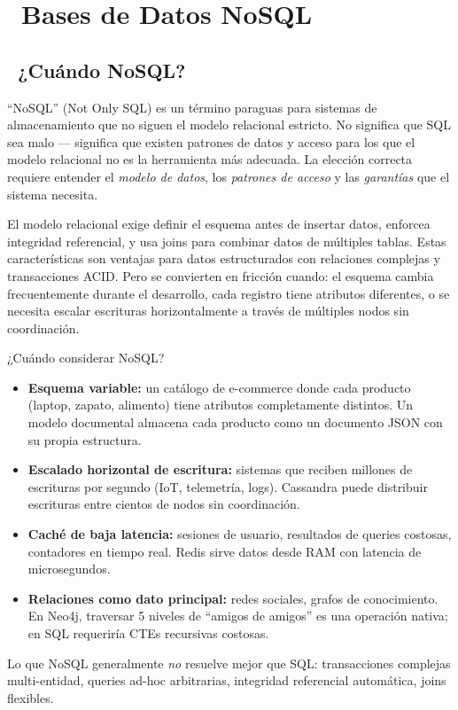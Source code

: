 \chapter[Bases de Datos NoSQL]{~Bases de Datos NoSQL}

\section[¿Cuándo NoSQL?]{~¿Cuándo NoSQL?}

``NoSQL'' (Not Only SQL) es un término paraguas para sistemas de almacenamiento que no siguen el modelo relacional estricto.
No significa que SQL sea malo — significa que existen patrones de datos y acceso para los que el modelo relacional no es la herramienta más adecuada.
La elección correcta requiere entender el \emph{modelo de datos}, los \emph{patrones de acceso} y las \emph{garantías} que el sistema necesita.

El modelo relacional exige definir el esquema antes de insertar datos, enforcea integridad referencial, y usa joins para combinar datos de múltiples tablas.
Estas características son ventajas para datos estructurados con relaciones complejas y transacciones ACID.
Pero se convierten en fricción cuando: el esquema cambia frecuentemente durante el desarrollo, cada registro tiene atributos diferentes, o se necesita escalar escrituras horizontalmente a través de múltiples nodos sin coordinación.

\begin{teoriabox}{¿Cuándo considerar NoSQL?}
\begin{itemize}
  \item \textbf{Esquema variable:} un catálogo de e-commerce donde cada producto (laptop, zapato, alimento) tiene atributos completamente distintos. Un modelo documental almacena cada producto como un documento JSON con su propia estructura.
  \item \textbf{Escalado horizontal de escritura:} sistemas que reciben millones de escrituras por segundo (IoT, telemetría, logs). Cassandra puede distribuir escrituras entre cientos de nodos sin coordinación.
  \item \textbf{Caché de baja latencia:} sesiones de usuario, resultados de queries costosas, contadores en tiempo real. Redis sirve datos desde RAM con latencia de microsegundos.
  \item \textbf{Relaciones como dato principal:} redes sociales, grafos de conocimiento. En Neo4j, traversar 5 niveles de ``amigos de amigos'' es una operación nativa; en SQL requeriría CTEs recursivas costosas.
\end{itemize}
Lo que NoSQL generalmente \emph{no} resuelve mejor que SQL: transacciones complejas multi-entidad, queries ad-hoc arbitrarias, integridad referencial automática, joins flexibles.
\end{teoriabox}

